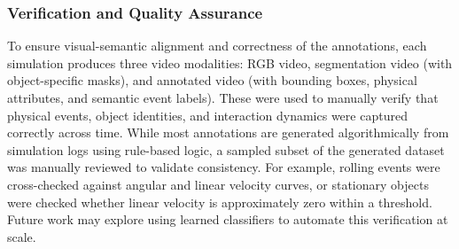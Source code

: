 \documentclass[conference]{IEEEtran}
\begin{document}
\subsubsection{Verification and Quality Assurance}
To ensure visual-semantic alignment and correctness of the annotations, each simulation produces three video modalities: RGB video, segmentation video (with object-specific masks), and annotated video (with bounding boxes, physical attributes, and semantic event labels). These were used to manually verify that physical events, object identities, and interaction dynamics were captured correctly across time.
While most annotations are generated algorithmically from simulation logs using rule-based logic, a sampled subset of the generated dataset was manually reviewed to validate consistency. For example, rolling events were cross-checked against angular and linear velocity curves, or stationary objects were checked whether linear velocity is approximately zero within a threshold. Future work may explore using learned classifiers to automate this verification at scale.




\end{document}
